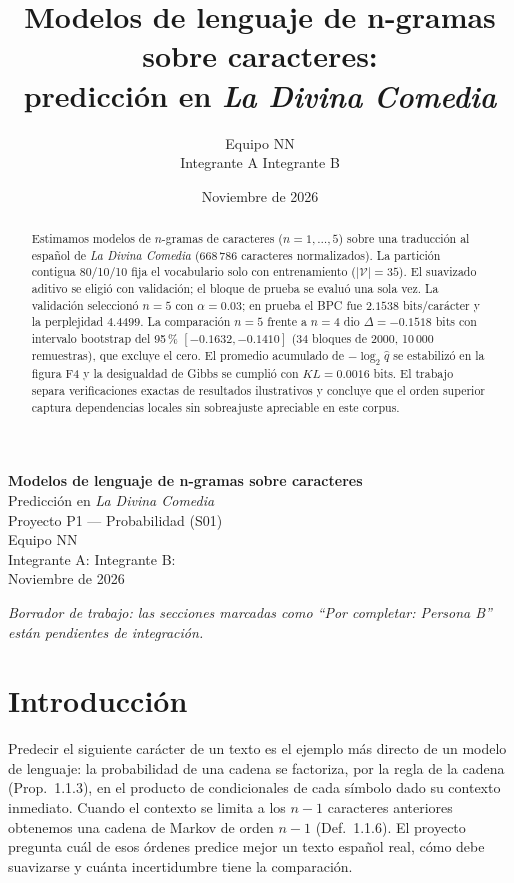\documentclass[11pt,letterpaper]{article}
\title{Modelos de lenguaje de n-gramas sobre caracteres:\\
       predicción en \emph{La Divina Comedia}}
\author{Equipo NN\\ Integrante A \quad Integrante B}
\date{Noviembre de 2026}
\begin{document}
\begin{titlepage}
\centering
{\Large \bfseries Modelos de lenguaje de n-gramas sobre caracteres}\\[0.6cm]
{\large Predicción en \emph{La Divina Comedia}}\\[1.2cm]
Proyecto P1 --- Probabilidad (S01)\\[0.4cm]
Equipo NN\\[0.2cm]
Integrante A: \underline{\hspace{4.5cm}}\quad Integrante B: \underline{\hspace{4.5cm}}\\[0.8cm]
Noviembre de 2026

\vfill
\textit{Borrador de trabajo: las secciones marcadas como
``Por completar: Persona B'' están pendientes de integración.}
\end{titlepage}

\begin{abstract}
Estimamos modelos de $n$-gramas de caracteres ($n=1,\dots,5$) sobre una traducción
al español de \emph{La Divina Comedia} (668\,786 caracteres normalizados). La
partición contigua 80/10/10 fija el vocabulario solo con entrenamiento
($\vert\mathcal{V}\vert=35$). El suavizado aditivo se eligió con validación; el
bloque de prueba se evaluó una sola vez. La validación seleccionó $n=5$ con
$\alpha=0.03$; en prueba el BPC fue $2.1538$ bits/carácter y la perplejidad
$4.4499$. La comparación $n=5$ frente a $n=4$ dio $\Delta=-0.1518$ bits con
intervalo bootstrap del 95\,\% $[-0.1632,-0.1410]$ (34 bloques de 2000,
10\,000 remuestras), que excluye el cero. El promedio acumulado de
$-\log_2\hat q$ se estabilizó en la figura F4 y la desigualdad de Gibbs se
cumplió con $KL=0.0016$ bits. El trabajo separa verificaciones exactas de
resultados ilustrativos y concluye que el orden superior captura dependencias
locales sin sobreajuste apreciable en este corpus.
\end{abstract}

\section{Introducción}

Predecir el siguiente carácter de un texto es el ejemplo más directo de un
modelo de lenguaje: la probabilidad de una cadena se factoriza, por la regla de
la cadena (Prop.\ 1.1.3), en el producto de condicionales de cada símbolo dado
su contexto inmediato. Cuando el contexto se limita a los $n-1$ caracteres
anteriores obtenemos una cadena de Markov de orden $n-1$ (Def.\ 1.1.6). El
proyecto pregunta cuál de esos órdenes predice mejor un texto español real,
cómo debe suavizarse y cuánta incertidumbre tiene la comparación.
\end{document}
